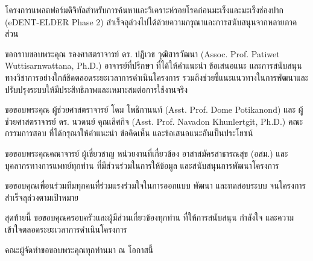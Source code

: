 \begin{acknowledgments}
โครงการแพลตฟอร์มดิจิทัลสำหรับการค้นหาและวิเคราะห์รอยโรคก่อนมะเร็งและมะเร็งช่องปาก (eDENT-ELDER Phase 2)
สำเร็จลุล่วงไปได้ด้วยความกรุณาและการสนับสนุนจากหลายภาคส่วน

ขอกราบขอบพระคุณ รองศาสตราจารย์ ดร. ปฏิเวธ วุฒิสารวัฒนา 
(Assoc. Prof. Patiwet Wuttisarnwattana, Ph.D.) อาจารย์ที่ปรึกษา 
ที่ได้ให้คำแนะนำ ข้อเสนอแนะ และการสนับสนุนทางวิชาการอย่างใกล้ชิดตลอดระยะเวลาการดำเนินโครงการ 
รวมถึงช่วยชี้แนะแนวทางในการพัฒนาและปรับปรุงระบบให้มีประสิทธิภาพและเหมาะสมต่อการใช้งานจริง

ขอขอบพระคุณ ผู้ช่วยศาสตราจารย์ โดม โพธิกานนท์ 
(Asst. Prof. Dome Potikanond) และ ผู้ช่วยศาสตราจารย์ ดร. นวดนย์ คุณเลิศกิจ 
(Asst. Prof. Navadon Khunlertgit, Ph.D.) คณะกรรมการสอบ 
ที่ได้กรุณาให้คำแนะนำ ข้อคิดเห็น และข้อเสนอแนะอันเป็นประโยชน์

ขอขอบพระคุณคณาจารย์ ผู้เชี่ยวชาญ หน่วยงานที่เกี่ยวข้อง อาสาสมัครสาธารณสุข (อสม.) 
และบุคลากรทางการแพทย์ทุกท่าน ที่มีส่วนร่วมในการให้ข้อมูล และสนับสนุนการพัฒนาโครงการ

ขอขอบคุณเพื่อนร่วมทีมทุกคนที่ร่วมแรงร่วมใจในการออกแบบ พัฒนา และทดสอบระบบ 
จนโครงการสำเร็จลุล่วงตามเป้าหมาย

สุดท้ายนี้ ขอขอบคุณครอบครัวและผู้มีส่วนเกี่ยวข้องทุกท่าน 
ที่ให้การสนับสนุน กำลังใจ และความเข้าใจตลอดระยะเวลาการดำเนินโครงการ

คณะผู้จัดทำขอขอบพระคุณทุกท่านมา ณ โอกาสนี้

\end{acknowledgments}%

\fi %

\contentspage

\ifproject
\figurelistpage

\tablelistpage
\fi %



